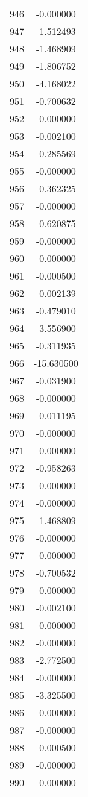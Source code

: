 \documentclass[12pt]{article}
\begin{document}
\begin{longtable}{@{}cc@{}}
946 & -0.000000 \\
947 & -1.512493 \\
948 & -1.468909 \\
949 & -1.806752 \\
950 & -4.168022 \\
951 & -0.700632 \\
952 & -0.000000 \\
953 & -0.002100 \\
954 & -0.285569 \\
955 & -0.000000 \\
956 & -0.362325 \\
957 & -0.000000 \\
958 & -0.620875 \\
959 & -0.000000 \\
960 & -0.000000 \\
961 & -0.000500 \\
962 & -0.002139 \\
963 & -0.479010 \\
964 & -3.556900 \\
965 & -0.311935 \\
966 & -15.630500 \\
967 & -0.031900 \\
968 & -0.000000 \\
969 & -0.011195 \\
970 & -0.000000 \\
971 & -0.000000 \\
972 & -0.958263 \\
973 & -0.000000 \\
974 & -0.000000 \\
975 & -1.468809 \\
976 & -0.000000 \\
977 & -0.000000 \\
978 & -0.700532 \\
979 & -0.000000 \\
980 & -0.002100 \\
981 & -0.000000 \\
982 & -0.000000 \\
983 & -2.772500 \\
984 & -0.000000 \\
985 & -3.325500 \\
986 & -0.000000 \\
987 & -0.000000 \\
988 & -0.000500 \\
989 & -0.000000 \\
990 & -0.000000 \\

\end{longtable}
\end{document}
